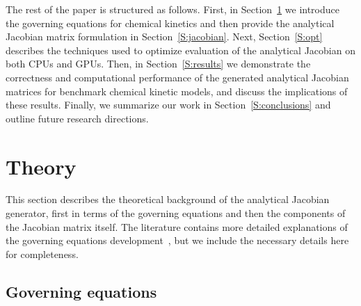 \documentclass[preprint,12pt]{elsarticle}
\begin{document}
The rest of the paper is structured as follows.
First, in Section~\ref{S:theory} we introduce the governing equations for chemical kinetics and then provide the analytical Jacobian matrix formulation in Section~\ref{S:jacobian}.
Next, Section~\ref{S:opt} describes the techniques used to optimize evaluation of the analytical Jacobian on both CPUs and GPUs.
Then, in Section~\ref{S:results} we demonstrate the correctness and computational performance of the generated analytical Jacobian matrices for benchmark chemical kinetic models, and discuss the implications of these results.
Finally, we summarize our work in Section~\ref{S:conclusions} and outline future research directions.

\section{Theory}
\label{S:theory}

This section describes the theoretical background of the analytical Jacobian generator, first in terms of the governing equations and then the components of the Jacobian matrix itself.
The literature contains more detailed explanations of the governing equations development~\cite{Law:2006tu,Warnatz:2006tq,Glassman:2008tq}, but we include the necessary details here for completeness.

\subsection{Governing equations}
\label{sec:goveq}
\end{document}

